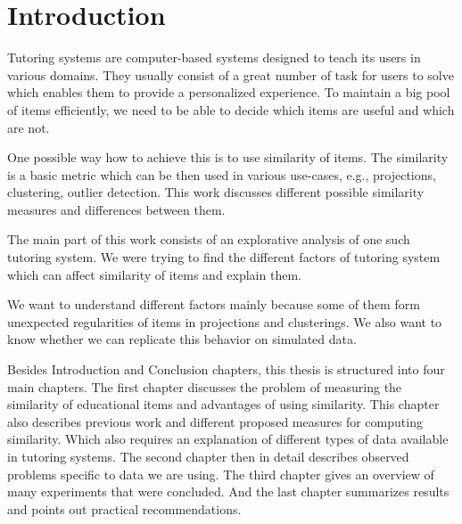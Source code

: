 \documentclass[
  digital, %
  table,   %
  nolof,     %
  nolot,     %
  nocover,
  color,
  final, %
]{fithesis3}
\begin{document}
\newcommand{\ppl}[1]{\textcolor[rgb]{0.6,0.2,1.0}{#1}}
\newcommand{\umimeCesky}{Umíme česky}
\newcommand{\cvicenieB}{``Vyjmenovaná slova po B''}




\chapter*{Introduction}


Tutoring systems are computer-based systems designed to teach its users in various domains. They usually consist of a great number of task for users to solve which enables them to provide a personalized experience. To maintain a big pool of items efficiently, we need to be able to decide which items are useful and which are not.


One possible way how to achieve this is to use similarity of items. The similarity is a basic metric which can be then used in various use-cases, e.g., projections, clustering, outlier detection. This work discusses different possible similarity measures and differences between them.


The main part of this work consists of an explorative analysis of one such tutoring system. We were trying to find the different factors of tutoring system which can affect similarity of items and explain them.


We want to understand different factors mainly because some of them form unexpected regularities of items in projections and clusterings. We also want to know whether we can replicate this behavior on simulated data.


Besides Introduction and Conclusion chapters, this thesis is structured into four main chapters. The first chapter discusses the problem of measuring the similarity of educational items and advantages of using similarity. This chapter also describes previous work and different proposed measures for computing similarity. Which also requires an explanation of different types of data available in tutoring systems. The second chapter then in detail describes observed problems specific to data we are using. The third chapter gives an overview of many experiments that were concluded. And the last chapter summarizes results and points out practical recommendations.
\end{document}

